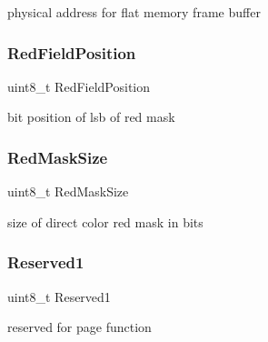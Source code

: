 physical address for flat memory frame buffer 

\hypertarget{structvbe__mode__info__t_a20cb142b8c1b0a2b41244fef469a11f4}{}\label{structvbe__mode__info__t_a20cb142b8c1b0a2b41244fef469a11f4} 
\subsubsection{\texorpdfstring{Red\+Field\+Position}{RedFieldPosition}}
{\footnotesize\ttfamily uint8\+\_\+t Red\+Field\+Position}



bit position of lsb of red mask 

\hypertarget{structvbe__mode__info__t_a5e25f6a8eedde631fff577bcf7d4f6f4}{}\label{structvbe__mode__info__t_a5e25f6a8eedde631fff577bcf7d4f6f4} 
\subsubsection{\texorpdfstring{Red\+Mask\+Size}{RedMaskSize}}
{\footnotesize\ttfamily uint8\+\_\+t Red\+Mask\+Size}



size of direct color red mask in bits 

\hypertarget{structvbe__mode__info__t_a604037992fe7e5fd08e1bcc684a1b12d}{}\label{structvbe__mode__info__t_a604037992fe7e5fd08e1bcc684a1b12d} 
\subsubsection{\texorpdfstring{Reserved1}{Reserved1}}
{\footnotesize\ttfamily uint8\+\_\+t Reserved1}



reserved for page function 

\hypertarget{structvbe__mode__info__t_a09b5824ec5c67bee2a4b36c0ab5181bc}{}\label{structvbe__mode__info__t_a09b5824ec5c67bee2a4b36c0ab5181bc} 
